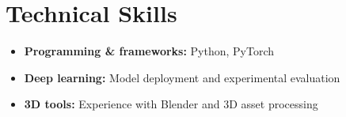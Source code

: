 \documentclass[a4paper,11pt]{article}
\begin{document}
\section{Technical Skills}
\begin{itemize}[leftmargin=0.15in,label={},itemsep=1pt]
\item\small\textbf{Programming \& frameworks:}  Python, PyTorch
\item\small\textbf{Deep learning:}  Model deployment and experimental evaluation
\item\small\textbf{3D tools:}  Experience with Blender and 3D asset processing
\end{itemize}
\end{document}

